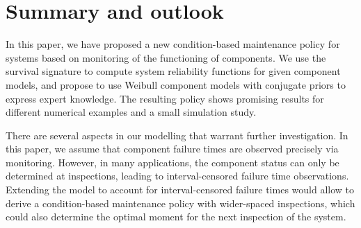 \documentclass[authoryear]{elsarticle}
\newcommand{\uz}{^{(0)}} %
\def\ykz{y\uz_k}
\newcommand{\tthresh}{\tau_{\text{thresh}}}
\begin{document}
\iffalse
\begin{figure}
\texttt{[image: br1sim1fig5]}
\texttt{[image: br1sim2fig5]}
\texttt{[image: br1sim3fig5]}
\texttt{[image: br1sim4fig5]}
\caption{***Simulation study with ***prospective costrate criterion***, $\tthresh = 0.5$.
TL: $\lambda_k =     \ykz$,
TR: $\lambda_k = 0.5 \ykz$,
BL: $\lambda_k = 2   \ykz$,
BR: $\lambda_k = 0.2 \ykz$}
\label{fig:simprospcostrate05}
\end{figure}

\begin{figure}
\texttt{[image: br1sim1fig5T]}
\texttt{[image: br1sim2fig5T]}
\texttt{[image: br1sim3fig5T]}
\texttt{[image: br1sim4fig5T]}
\caption{***Simulation study with ***total costrate criterion***, $\tthresh = 0.5$.
TL: $\lambda_k =     \ykz$,
TR: $\lambda_k = 0.5 \ykz$,
BL: $\lambda_k = 2   \ykz$,
BR: $\lambda_k = 0.2 \ykz$}
\label{fig:simtotalcostrate05}
\end{figure}

\begin{figure}
\texttt{[image: br1sim2fig5Tt01]}
\texttt{[image: br1sim2fig5Tt02]}
\caption{***Simulation study with ***total costrate criterion***, early failures ($0.5 \times$ MTTF),
$\tthresh = 0.1$ (left) and $\tthresh = 0.2$ (right).}
\label{fig:simtotalcostrate0102}
\end{figure}
\fi


\section{Summary and outlook}
\label{sec:outlook}

In this paper, we have proposed a new condition-based maintenance policy
for systems based on monitoring of the functioning of components.
We use the survival signature to compute system reliability functions
for given component models, and propose to use Weibull component models
with conjugate priors to express expert knowledge.
The resulting policy shows promising results for
different numerical examples and a small simulation study.

There are several aspects in our modelling that warrant further investigation.
In this paper, we assume that component failure times are observed precisely via monitoring.
However, in many applications, the component status can only be determined
at inspections, leading to interval-censored failure time observations.
Extending the model to account for interval-censored failure times
would allow to derive a condition-based maintenance policy with wider-spaced inspections,
which could also determine the optimal moment for the next inspection of the system.
\end{document}
